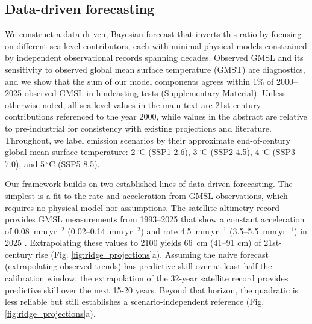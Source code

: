 \documentclass[12pt]{article}
\begin{document}
\subsection*{Data-driven forecasting}

We construct a data-driven, Bayesian forecast that inverts this ratio by focusing on different sea-level contributors, each with minimal physical models constrained by independent observational records spanning decades. Observed GMSL and its sensitivity to observed global mean surface temperature (GMST) are diagnostics, and we show that the sum of our model components agrees within 1\% of 2000--2025 observed GMSL in hindcasting tests (Supplementary Material). Unless otherwise noted, all sea-level values in the main text are 21st-century contributions referenced to the year 2000, while values in the abstract are relative to pre-industrial for consistency with existing projections and literature. Throughout, we label emission scenarios by their approximate end-of-century global mean surface temperature: 2$\,^\circ$C (SSP1-2.6), 3$\,^\circ$C (SSP2-4.5), 4$\,^\circ$C (SSP3-7.0), and 5$\,^\circ$C (SSP5-8.5).

Our framework builds on two established lines of data-driven forecasting. The simplest is a fit to the rate and acceleration from GMSL observations, which requires no physical model nor assumptions. The satellite altimetry record provides GMSL measurements from 1993--2025 that show a constant acceleration of 0.08~mm\,yr$^{-2}$ (0.02--0.14~mm\,yr$^{-2}$) and rate 4.5~mm\,yr$^{-1}$ (3.5--5.5~mm\,yr$^{-1}$) in 2025 \citep{Hamlington2022, Hamlington2024}. Extrapolating these values to 2100 yields 66~cm (41--91 cm) of 21st-century rise (Fig. \ref{fig:ridge_projections}a). Assuming the naive forecast (extrapolating observed trends) has predictive skill over at least half the calibration window, the extrapolation of the 32-year satellite record provides predictive skill over the next 15-20 years. Beyond that horizon, the quadratic is less reliable but still establishes a scenario-independent reference (Fig. \ref{fig:ridge_projections}a). 
\end{document}
